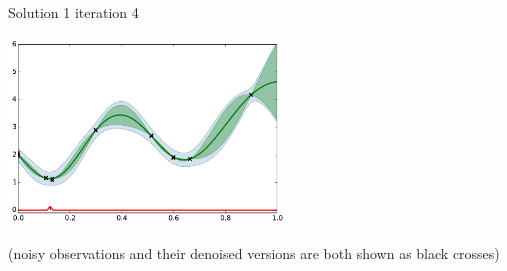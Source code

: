 \documentclass{beamer}
\begin{document}
\begin{frame}[noframenumbering]{Solution 1}
iteration 4
\begin{center}
\includegraphics[height=5cm]{figures/python/ego_EI1n4}
\end{center}
\tiny (noisy observations and their denoised versions are both shown as black crosses)\\
\end{frame}



\end{document}
